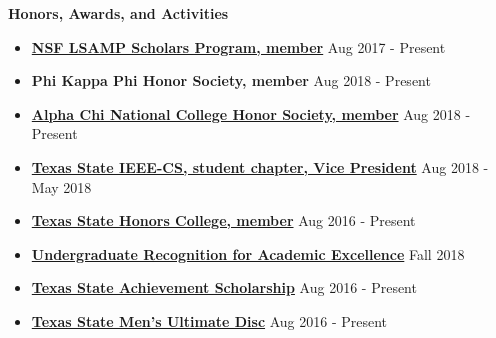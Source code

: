 \documentclass[letterpaper, 10pt]{article}
\newcommand{\resheading}[1]{
    \begin{mdframed}[
        backgroundcolor=black!15,
        linewidth=0.75pt,
        innertopmargin=4pt,
        innerbottommargin=4pt,
        skipabove=6pt,
        skipbelow=2pt]
        \textbf{\large #1}
    \end{mdframed}
}
\newenvironment{resitemize}{
    \vspace{-6pt}
    \begin{itemize}
    \setlength\itemsep{-2pt}
}{
    \end{itemize}
}
\newcommand{\resdateitem}[2]{
    \item \textbf{#1} \hfill #2 \\
}
\begin{document}
\begin{NoHyper}
    
    
    










%   
%


\resheading{Honors, Awards, and Activities}
\begin{resitemize}
    \resdateitem{\href{http://hlsamp.cose.txstate.edu/}{NSF LSAMP Scholars Program, member}}{Aug 2017 - Present}
    \resdateitem{Phi Kappa Phi Honor Society, member}{Aug 2018 - Present}
    \resdateitem{\href{https://ims.alphachihonor.org/}{Alpha Chi National College Honor Society, member}}{Aug 2018 - Present}
    \resdateitem{\href{https://www.facebook.com/TXST.IEEE/}{Texas State IEEE-CS, student chapter, Vice President}}{Aug 2018 - May 2018}
    \resdateitem{\href{http://www.txstate.edu/honors/}{Texas State Honors College, member}}{Aug 2016 - Present}
    \resdateitem{\href{http://www.math.txstate.edu/about/archive/2017-18/awards-day.html}{Undergraduate Recognition for Academic Excellence}}{Fall 2018}
    \resdateitem{\href{http://www.finaid.txstate.edu/scholarships/freshman/assured.html}{Texas State Achievement Scholarship}}{Aug 2016 - Present}
    \resdateitem{\href{http://www.campusrecreation.txstate.edu/sport-clubs/club-pages/Ultimate-Disc.html}{Texas State Men's Ultimate Disc}}{Aug 2016 - Present}
    

\end{resitemize}
\end{NoHyper}
\end{document}
